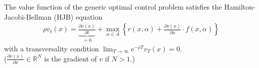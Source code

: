 \documentclass[11pt]{elegantbook}
\begin{document}
\begin{proposition}
    The value function of the generic optimal control problem satisfies the Hamilton-Jacobi-Bellman (HJB) equation
    \begin{equation}
        \begin{aligned}
            \rho v_t(x) = \underbrace{\frac{\partial v(x)}{\partial t}}_{=0} + \max_{\alpha\in A}\left\{r(x,\alpha) + \frac{\partial v(x)}{\partial x}\cdot f(x,\alpha)\right\}
        \end{aligned}
        \nonumber
    \end{equation}
    with a transversality condition $\lim_{T \rightarrow \infty}e^{-\rho T}v_T(x)=0$.\\
    ($\frac{\partial v(x)}{\partial x}\in \mathbb{R}^N$ is the gradient of $v$ if $N>1$.)
\end{proposition}
\end{document}
